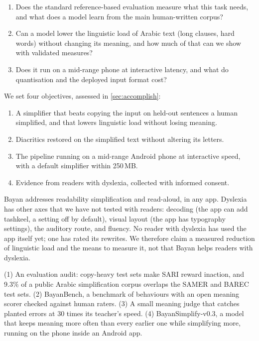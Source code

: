 \documentclass[10pt,a4paper]{article}
\newcommand{\vThree}{BayanSimplify-v0.3}
\begin{document}
\begin{enumerate}[label=\textbf{RQ\arabic*}, leftmargin=10mm]
\item Does the standard reference-based evaluation measure what this task needs,
      and what does a model learn from the main human-written corpus?
\item Can a model lower the linguistic load of Arabic text (long clauses, hard
      words) without changing its meaning, and how much of that can we show with
      validated measures?
\item Does it run on a mid-range phone at interactive latency, and what do
      quantisation and the deployed input format cost?
\end{enumerate}

\noindent We set four objectives, assessed in \autoref{sec:accomplish}:
\begin{enumerate}[label=\textbf{O\arabic*}, leftmargin=10mm]
\item A simplifier that beats copying the input on held-out sentences a human
      simplified, and that lowers linguistic load without losing meaning.
\item Diacritics restored on the simplified text without altering its letters.
\item The pipeline running on a mid-range Android phone at interactive speed,
      with a default simplifier within 250\,MB.
\item Evidence from readers with dyslexia, collected with informed consent.
\end{enumerate}

 Bayan addresses readability simplification and
read-aloud, in any app. Dyslexia has other axes that we have not tested with
readers: decoding (the app can add tashkeel, a setting off by default), visual
layout (the app has typography settings), the auditory route, and fluency. No
reader with dyslexia has used the app itself yet; one has rated its rewrites. We
therefore claim a measured reduction of linguistic load and the means to measure
it, not that Bayan helps readers with dyslexia.

 (1) An evaluation audit: copy-heavy test sets make SARI
reward inaction, and 9.3\% of a public Arabic simplification corpus overlaps the
SAMER and BAREC test sets. (2) BayanBench, a benchmark of behaviours with an open
meaning scorer checked against human raters. (3) A small meaning judge that
catches planted errors at 30 times its teacher's speed. (4) \vThree{}, a model
that keeps meaning more often than every earlier one while simplifying more,
running on the phone inside an Android app.
\end{document}
